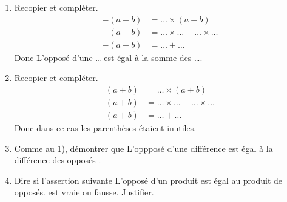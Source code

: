 \begin{exercice*}[Démonstrations]
    \begin{enumerate}
        \item Recopier et compléter.
        \begin{align*}
            -(a+b)&= \dots\times(a+b)\\
            -(a+b)&= \dots\times\dots + \dots\times\dots\\
            -(a+b)&= \dots+\dots
        \end{align*}
        Donc \og{} L'opposé d'une \dots{} est égal à la somme des \dots \fg{}.
        \item Recopier et compléter.
        \begin{align*}
            (a+b)&= \dots\times(a+b)\\
            (a+b)&= \dots\times\dots + \dots\times\dots\\
            (a+b)&= \dots+\dots
        \end{align*}
        Donc dans ce cas les parenthèses étaient inutiles.
        \item Comme au 1), démontrer que \og{} L'oppposé d'une différence est égal à la différence des opposés \fg{}.
        \item Dire si l'assertion suivante  \og{} L'opposé d'un produit est égal au produit de opposés.\fg{} est vraie ou fausse. Justifier.
    \end{enumerate}
\end{exercice*}
